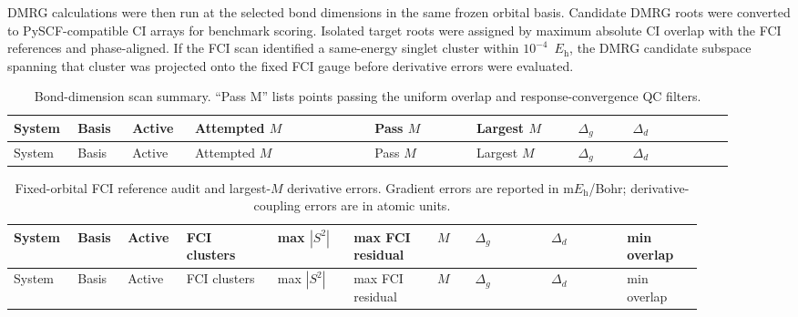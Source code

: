 \documentclass[manuscript=suppinfo]{achemso}
\newcommand{\Eh}{E_{\mathrm{h}}}
\begin{document}
DMRG calculations were then run at the selected bond dimensions in the same
frozen orbital basis.  Candidate DMRG roots were converted to PySCF-compatible
CI arrays for benchmark scoring.  Isolated target roots were assigned by maximum
absolute CI overlap with the FCI references and phase-aligned.  If the FCI scan
identified a same-energy singlet cluster within $10^{-4}$~$\Eh$, the DMRG
candidate subspace spanning that cluster was projected onto the fixed FCI gauge
before derivative errors were evaluated.

\begin{landscape}
\begingroup
\tiny
\setlength{\tabcolsep}{2pt}
\begin{longtable}{P{0.08\linewidth}P{0.07\linewidth}P{0.08\linewidth}P{0.23\linewidth}P{0.13\linewidth}P{0.13\linewidth}P{0.07\linewidth}P{0.13\linewidth}}
\caption{Bond-dimension scan summary.  ``Pass M'' lists points passing the
uniform overlap and response-convergence QC filters.}
\label{tab:si-scan-summary}\\
\toprule
System & Basis & Active & Attempted $M$ & Pass $M$ & Largest $M$ & $\Delta_g$ & $\Delta_d$ \\
\midrule
\endfirsthead
\toprule
System & Basis & Active & Attempted $M$ & Pass $M$ & Largest $M$ & $\Delta_g$ & $\Delta_d$ \\
\midrule
\endhead

\bottomrule
\end{longtable}
\endgroup
\end{landscape}

\begin{landscape}
\begingroup
\tiny
\setlength{\tabcolsep}{2pt}
\begin{longtable}{P{0.07\linewidth}P{0.06\linewidth}P{0.07\linewidth}P{0.12\linewidth}P{0.10\linewidth}P{0.11\linewidth}P{0.05\linewidth}P{0.10\linewidth}P{0.10\linewidth}P{0.10\linewidth}}
\caption{Fixed-orbital FCI reference audit and largest-$M$ derivative errors.
Gradient errors are reported in m$\Eh$/Bohr; derivative-coupling errors are in
atomic units.}
\label{tab:si-reference-audit}\\
\toprule
System & Basis & Active & FCI clusters & max $|S^2|$ & max FCI residual & $M$ & $\Delta_g$ & $\Delta_d$ & min overlap \\
\midrule
\endfirsthead
\toprule
System & Basis & Active & FCI clusters & max $|S^2|$ & max FCI residual & $M$ & $\Delta_g$ & $\Delta_d$ & min overlap \\
\midrule
\endhead

\bottomrule
\end{longtable}
\endgroup
\end{landscape}
\end{document}

